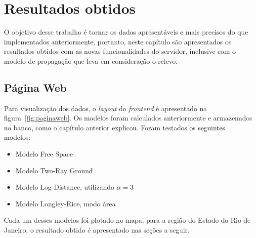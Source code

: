 \chapter{Resultados obtidos}

O objetivo desse trabalho é tornar os dados apresentáveis e mais precisos do que implementados anteriormente, portanto, neste capítulo são apresentados os resultados obtidos com as novas funcionalidades do servidor, inclusive com o modelo de propagação que leva em consideração o relevo.

\section{Página Web}

Para visualização dos dados, o \textit{layout} do \textit{frontend} é apresentado na figura~\ref{fig:paginaweb}. Os modelos foram calculados anteriormente e armazenados no banco, como o capítulo anterior explicou.
Foram testados os seguintes modelos:

\begin{itemize}
\item Modelo Free Space
\item Modelo Two-Ray Ground
\item Modelo Log Distance, utilizando \begin{math}\alpha=3 \end{math}
\item Modelo Longley-Rice, modo área
\end{itemize}

Cada um desses modelos foi plotado no mapa, para a região do Estado do Rio de Janeiro, o resultado obtido é apresentado nas seções a seguir.

